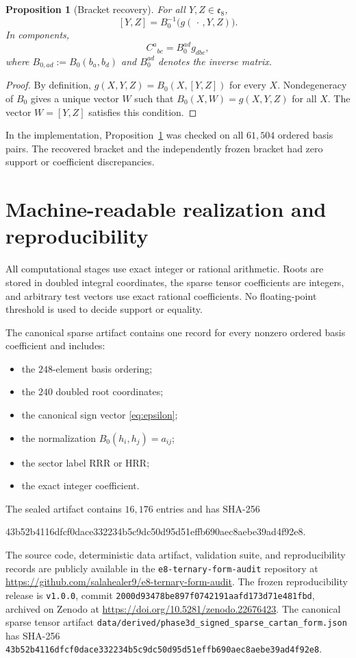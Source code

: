 \documentclass[11pt]{article}
\newtheorem{proposition}[theorem]{Proposition}
\theoremstyle{definition}
\theoremstyle{remark}
\newcommand{\e}{\mathfrak e}
\newcommand{\RRR}{\mathrm{RRR}}
\newcommand{\HRR}{\mathrm{HRR}}
\begin{document}
\begin{proposition}[Bracket recovery]\label{prop:bracketrecovery}
For all $Y,Z\in\e_8$,
\[
[Y,Z]=B_0^{-1}\bigl(g(\,\cdot\,,Y,Z)\bigr).
\]
In components,
\[
C^{a}{}_{bc}=B_0^{ad}g_{dbc},
\]
where $B_{0,ad}:=B_0(b_a,b_d)$ and $B_0^{ad}$ denotes the inverse matrix.
\end{proposition}

\begin{proof}
By definition, $g(X,Y,Z)=B_0(X,[Y,Z])$ for every $X$.  Nondegeneracy of $B_0$ gives a unique vector $W$ such that $B_0(X,W)=g(X,Y,Z)$ for all $X$.  The vector $W=[Y,Z]$ satisfies this condition.
\end{proof}

In the implementation, Proposition~\ref{prop:bracketrecovery} was checked on all $61{,}504$ ordered basis pairs.  The recovered bracket and the independently frozen bracket had zero support or coefficient discrepancies.

\section{Machine-readable realization and reproducibility}\label{sec:data}

All computational stages use exact integer or rational arithmetic.  Roots are stored in doubled integral coordinates, the sparse tensor coefficients are integers, and arbitrary test vectors use exact rational coefficients.  No floating-point threshold is used to decide support or equality.

The canonical sparse artifact contains one record for every nonzero ordered basis coefficient and includes:
\begin{itemize}
\item the $248$-element basis ordering;
\item the $240$ doubled root coordinates;
\item the canonical sign vector \eqref{eq:epsilon};
\item the normalization $B_0(h_i,h_j)=a_{ij}$;
\item the sector label $\RRR$ or $\HRR$;
\item the exact integer coefficient.
\end{itemize}

The sealed artifact contains $16{,}176$ entries and has SHA-256
\begin{center}
\small\ttfamily
43b52b4116dfcf0dace332234b5c9dc50d95d51effb690aec8aebe39ad4f92e8.
\end{center}
The source code, deterministic data artifact, validation suite, and reproducibility records are publicly available in the \texttt{e8-ternary-form-audit} repository at \url{https://github.com/salahealer9/e8-ternary-form-audit}.
The frozen reproducibility release is \texttt{v1.0.0}, commit \texttt{2000d93478be897f0742191aafd173d71e481fbd}, archived on Zenodo at \url{https://doi.org/10.5281/zenodo.22676423}.
The canonical sparse tensor artifact \nolinkurl{data/derived/phase3d_signed_sparse_cartan_form.json} has SHA-256 \nolinkurl{43b52b4116dfcf0dace332234b5c9dc50d95d51effb690aec8aebe39ad4f92e8}.
\end{document}
